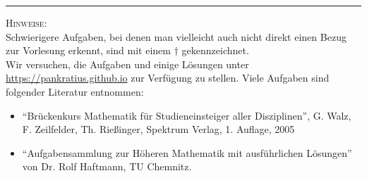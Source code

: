 \documentclass[11pt]{article}
\begin{document}
\hrule
\vspace{.5cm}
\noindent
\textsc{Hinweise:}\\
Schwierigere Aufgaben, bei denen man vielleicht auch nicht direkt einen Bezug zur Vorlesung erkennt, sind mit einem $\dagger$ gekennzeichnet.\\
Wir versuchen, die Aufgaben und einige Lösungen unter \url{https://pankratius.github.io} zur Verfügung zu stellen.
Viele Aufgaben sind folgender Literatur entnommen:
\begin{itemize}
	\item ``Br\"uckenkurs Mathematik f\"ur Studieneinsteiger aller Disziplinen'', G. Walz, F. Zeilfelder, Th. Rie\ss inger, Spektrum Verlag, 1. Auflage, 2005
	\item ``Aufgabensammlung zur H\"oheren Mathematik mit ausf\"uhrlichen L\"osungen'' von Dr. Rolf Haftmann, TU Chemnitz.
\end{itemize}
\end{document}
